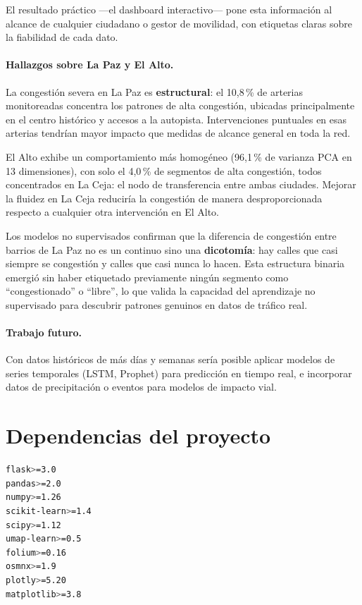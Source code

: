 \documentclass[12pt,a4paper]{article}
\begin{document}
\medskip

El resultado práctico —el dashboard interactivo— pone esta información
al alcance de cualquier ciudadano o gestor de movilidad,
con etiquetas claras sobre la fiabilidad de cada dato.

\paragraph{Hallazgos sobre La Paz y El Alto.}
La congestión severa en La Paz es \textbf{estructural}: el 10{,}8\,\% de
arterias monitoreadas concentra los patrones de alta congestión, ubicadas
principalmente en el centro histórico y accesos a la autopista.
Intervenciones puntuales en esas arterias tendrían mayor impacto que
medidas de alcance general en toda la red.

El Alto exhibe un comportamiento más homogéneo (96{,}1\,\% de varianza
PCA en 13 dimensiones), con solo el 4{,}0\,\% de segmentos de alta
congestión, todos concentrados en La Ceja: el nodo de transferencia entre
ambas ciudades.
Mejorar la fluidez en La Ceja reduciría la congestión de manera
desproporcionada respecto a cualquier otra intervención en El Alto.

Los modelos no supervisados confirman que la diferencia de congestión
entre barrios de La Paz no es un continuo sino una \textbf{dicotomía}:
hay calles que casi siempre se congestión y calles que casi nunca lo hacen.
Esta estructura binaria emergió sin haber etiquetado previamente ningún
segmento como ``congestionado'' o ``libre'', lo que valida la capacidad
del aprendizaje no supervisado para descubrir patrones genuinos en datos
de tráfico real.

\paragraph{Trabajo futuro.}
Con datos históricos de más días y semanas sería posible aplicar
modelos de series temporales (LSTM, Prophet) para predicción en tiempo real,
e incorporar datos de precipitación o eventos para modelos de impacto vial.

\appendix
\section{Dependencias del proyecto}

\begin{lstlisting}[language=bash, caption={requirements.txt resumido.},
    keywordstyle=\color{azulAS}]
flask>=3.0
pandas>=2.0
numpy>=1.26
scikit-learn>=1.4
scipy>=1.12
umap-learn>=0.5
folium>=0.16
osmnx>=1.9
plotly>=5.20
matplotlib>=3.8
\end{lstlisting}
\end{document}
